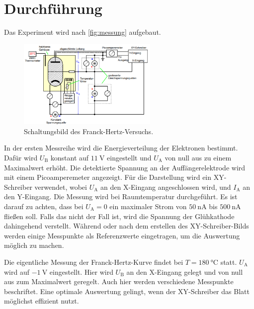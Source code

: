\section{Durchführung}
\label{sec:Durchführung}


Das Experiment wird nach \autoref{fig:messung} aufgebaut.

\begin{figure}
    \centering
    \includegraphics[width=0.6\textwidth]{images/bild5.png}
    \caption{Schaltungsbild des Franck-Hertz-Versuchs.\cite{V601}}
    \label{fig:messung}
\end{figure}

In der ersten Messreihe wird die Energieverteilung der Elektronen bestimmt.
Dafür wird $U_\text{B}$ konstant auf $\SI{11}{\volt}$ eingestellt und $U_\text{A}$ von null aus zu einem Maximalwert erhöht.
Die detektierte Spannung an der Auffängerelektrode wird mit einem Picoamperemeter angezeigt.
Für die Darstellung wird ein XY-Schreiber verwendet, wobei $U_\text{A}$ an den X-Eingang angeschlossen wird, und $I_\text{A}$ an den Y-Eingang.
Die Messung wird bei Raumtemperatur durchgeführt.
Es ist darauf zu achten, dass bei $U_\text{A} = 0$ ein maximaler Strom von $\SI{50}{\nano\ampere}$ bis $\SI{500}{\nano\ampere}$ fließen soll. 
Falls das nicht der Fall ist, wird die Spannung der Glühkathode dahingehend verstellt.
Während oder nach dem erstellen des XY-Schreiber-Bilds werden einige Messpunkte als Referenzwerte eingetragen, um die Auswertung möglich zu machen.

Die eigentliche Messung der Franck-Hertz-Kurve findet bei $T = \SI{180}{\celsius}$ statt.
$U_\text{A}$ wird auf $\SI{-1}{\volt}$ eingestellt.
Hier wird $U_\text{B}$ an den X-Eingang gelegt und von null aus zum Maximalwert geregelt.
Auch hier werden verschiedene Messpunkte beschriftet.
Eine optimale Auswertung gelingt, wenn der XY-Schreiber das Blatt möglichst effizient nutzt.
